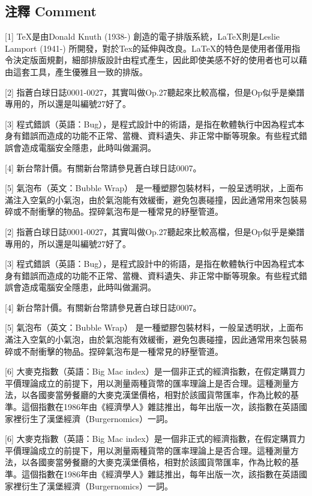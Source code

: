 \documentclass[
]{article}
\begin{document}
\hypertarget{ux6ce8ux91cb-comment-21}{%
\subsection{注釋 Comment}\label{ux6ce8ux91cb-comment-21}}

{[}1{]} TeX是由Donald Knuth (1938-) 創造的電子排版系統，LaTeX則是Leslie
Lamport (1941-)
所開發，對於Tex的延伸與改良。LaTeX的特色是使用者僅用指令決定版面規劃，細部排版設計由程式產生，因此即使美感不好的使用者也可以藉由這套工具，產生優雅且一致的排版。

{[}2{]}
指蒼白球日誌0001-0027，其實叫做Op.27聽起來比較高檔，但是Op似乎是樂譜專用的，所以還是叫編號27好了。

{[}3{]}
程式錯誤（英語：Bug），是程式設計中的術語，是指在軟體執行中因為程式本身有錯誤而造成的功能不正常、當機、資料遺失、非正常中斷等現象。有些程式錯誤會造成電腦安全隱患，此時叫做漏洞。

{[}4{]} 新台幣計價。有關新台幣請參見蒼白球日誌0007。

{[}5{]} 氣泡布（英文：Bubble Wrap）
是一種塑膠包裝材料，一般呈透明狀，上面布滿注入空氣的小氣泡，由於氣泡能有效緩衝，避免包裹碰撞，因此通常用來包裝易碎或不耐衝擊的物品。捏碎氣泡布是一種常見的紓壓管道。

{[}2{]}
指蒼白球日誌0001-0027，其實叫做Op.27聽起來比較高檔，但是Op似乎是樂譜專用的，所以還是叫編號27好了。

{[}3{]}
程式錯誤（英語：Bug），是程式設計中的術語，是指在軟體執行中因為程式本身有錯誤而造成的功能不正常、當機、資料遺失、非正常中斷等現象。有些程式錯誤會造成電腦安全隱患，此時叫做漏洞。

{[}4{]} 新台幣計價。有關新台幣請參見蒼白球日誌0007。

{[}5{]} 氣泡布（英文：Bubble Wrap）
是一種塑膠包裝材料，一般呈透明狀，上面布滿注入空氣的小氣泡，由於氣泡能有效緩衝，避免包裹碰撞，因此通常用來包裝易碎或不耐衝擊的物品。捏碎氣泡布是一種常見的紓壓管道。

{[}6{]} 大麥克指數（英語：Big Mac
index）是一個非正式的經濟指數，在假定購買力平價理論成立的前提下，用以測量兩種貨幣的匯率理論上是否合理。這種測量方法，以各國麥當勞餐廳的大麥克漢堡價格，相對於該國貨幣匯率，作為比較的基準。這個指數在1986年由《經濟學人》雜誌推出，每年出版一次，該指數在英語國家裡衍生了漢堡經濟（Burgernomics）一詞。

{[}6{]} 大麥克指數（英語：Big Mac
index）是一個非正式的經濟指數，在假定購買力平價理論成立的前提下，用以測量兩種貨幣的匯率理論上是否合理。這種測量方法，以各國麥當勞餐廳的大麥克漢堡價格，相對於該國貨幣匯率，作為比較的基準。這個指數在1986年由《經濟學人》雜誌推出，每年出版一次，該指數在英語國家裡衍生了漢堡經濟（Burgernomics）一詞。
\end{document}
